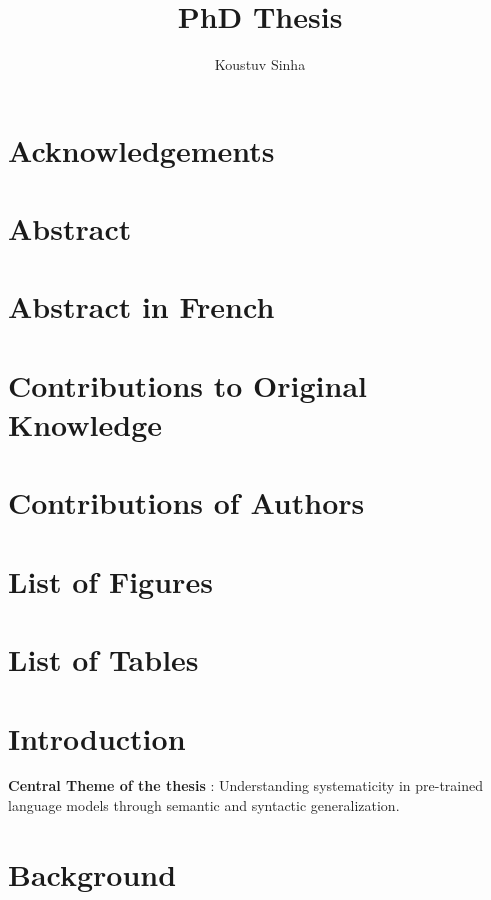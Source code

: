\documentclass[letterpaper, 12pt]{report}
\author{Koustuv Sinha}
\date{}
\title{PhD Thesis}
\begin{document}
\maketitle
\raggedbottom
{}%
{}

\part*{Acknowledgements}
\label{sec:org7e5c0aa}
\part*{Abstract}
\label{sec:org5a975de}
\part*{Abstract in French}
\label{sec:orge2ad76f}
\part*{Contributions to Original Knowledge}
\label{sec:org6846130}
\part*{Contributions of Authors}
\label{sec:org4da2d9f}
\part*{List of Figures}
\label{sec:org165ba31}
\part*{List of Tables}
\label{sec:orgc95eccf}
\clearpage
\setcounter{tocdepth}{3}
\tableofcontents

\clearpage

\part{Introduction}
\label{sec:org3362b2c}
\textbf{\textbf{Central Theme of the thesis}} : Understanding systematicity in pre-trained language models through semantic and syntactic generalization.


\clearpage
\part{Background}
\label{sec:org92ee0e4}
\end{document}
